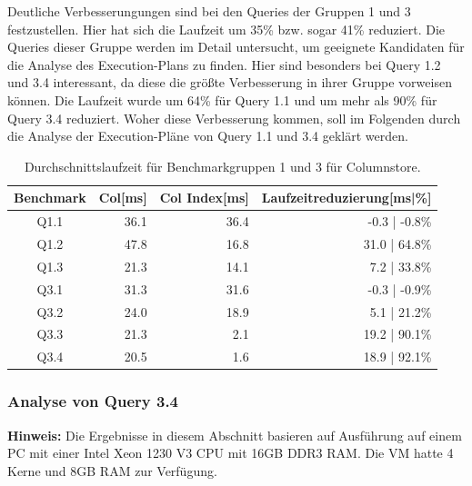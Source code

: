 Deutliche Verbesserungungen sind bei den Queries der Gruppen 1 und 3 festzustellen. Hier hat sich die Laufzeit um 35\% bzw. sogar 41\% reduziert. 
Die Queries dieser Gruppe werden im Detail untersucht, um geeignete Kandidaten für die Analyse des Execution-Plans zu finden.
Hier sind besonders bei Query 1.2 und 3.4 interessant, da diese die größte Verbesserung in ihrer Gruppe vorweisen können. 
Die Laufzeit wurde um 64\% für Query 1.1 und um mehr als 90\% für Query 3.4 reduziert. Woher diese Verbesserung kommen, soll im Folgenden durch die Analyse der Execution-Pläne von Query 1.1 und 3.4 geklärt werden.


\begin{table}[H]
    \centering
    \begin{tabularx}{\linewidth}{crrr}
        \toprule
        Benchmark           & Col[ms]       & Col Index[ms] & Laufzeitreduzierung[ms|\%]   \\
        \toprule
        Q1.1                & 36.1          & 36.4          & -0.3 | -0.8\%                \\
        Q1.2                & 47.8          & 16.8          & 31.0 | 64.8\%                 \\
        Q1.3                & 21.3          & 14.1          & 7.2 | 33.8\%                \\
        \midrule
        Q3.1                & 31.3          & 31.6          & -0.3 | -0.9\%                \\
        Q3.2                & 24.0          & 18.9          & 5.1 | 21.2\%                 \\
        Q3.3                & 21.3          & 2.1           & 19.2 | 90.1\%                \\
        Q3.4                & 20.5          & 1.6           & 18.9 | 92.1\%                \\
        \bottomrule
    \end{tabularx}
\caption{Durchschnittslaufzeit für Benchmarkgruppen 1 und 3 für Columnstore.}
\label{tab:q1_q3_col}
\end{table}

\subsubsection{Analyse von Query 3.4}
\textbf{Hinweis:} Die Ergebnisse in diesem Abschnitt basieren auf Ausführung auf einem PC mit einer Intel Xeon 1230 V3 CPU mit 16GB DDR3 RAM. Die VM hatte 4 Kerne und 8GB RAM zur Verfügung.

